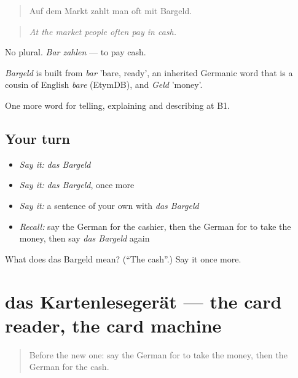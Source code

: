 \begin{quote}
Auf dem Markt zahlt man oft mit Bargeld.
\end{quote}

\begin{quote}
\emph{At the market people often pay in cash.}
\end{quote}

No plural. \emph{Bar zahlen} — to pay cash.

\begin{cousinweb}
\emph{Bargeld} is built from \emph{bar} 'bare, ready', an inherited Germanic word that is a cousin of English \emph{bare} (EtymDB), and \emph{Geld} 'money'.
\end{cousinweb}

\begin{grammarlens}[title={What you've built}]
One more word for telling, explaining and describing at B1.
\end{grammarlens}

\subsection*{Your turn}
\begin{itemize}
\raggedright
  \item \emph{Say it:} \emph{das Bargeld}
  \item \emph{Say it:} \emph{das Bargeld}, once more
  \item \emph{Say it:} a sentence of your own with \emph{das Bargeld}
  \item \emph{Recall:} say the German for the cashier, then the German for to take the money, then say \emph{das Bargeld} again
\end{itemize}

\begin{tcolorbox}[breakable,colback=teal!4,colframe=teal!35!black,title={Before you move on}]
What does das Bargeld mean? (\textquotedblleft{}The cash\textquotedblright{}.) Say it once more.
\end{tcolorbox}
\section[das Kartenlesegerät]{das Kartenlesegerät — the card reader, the card machine}

\label{lesson:GE-C449-kartenlesegeraet}



\begin{quote}
Before the new one: say the German for to take the money, then the German for the cash.
\end{quote}

